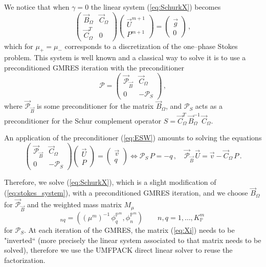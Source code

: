 \documentclass[a4paper,12pt,onecolumn]{article}
\newcommand{\pspace}{\mathbb{P}}
\begin{document}
We notice that when $\gamma = 0$ the linear system (\ref{eq:SchurkX}) becomes
\begin{equation} \label{eq:stokes_system}
\begin{pmatrix}
\vec B_\Omega & \vec C_\Omega \\
\vec C_\Omega^T & 0 
\end{pmatrix}
\begin{pmatrix}
\vec U^{m+1} \\ P^{m+1} 
\end{pmatrix}
= \begin{pmatrix}
\vec g \\
0
\end{pmatrix}\,,
\end{equation}
which for $\mu_+=\mu_-$ corresponds to a discretization of the one--phase Stokes problem. This system is well known and a classical way to solve it is to use a preconditioned GMRES iteration with the preconditioner
\begin{equation} \label{eq:ESW}
\mathcal{P} = \begin{pmatrix}
\vec{\mathcal{P}}_{\vec B} & \vec C_\Omega \\
0 & -\mathcal{P}_S
\end{pmatrix}\,,
\end{equation}
where $\vec{\mathcal{P}}_{\vec B}$ is some preconditioner for the matrix $\vec B_\Omega$, and $\mathcal{P}_S$ acts as a preconditioner for the Schur complement operator $S=\vec C^T_\Omega \,\vec B_\Omega^{-1}\,\vec C_\Omega$. 

An application of the preconditioner (\ref{eq:ESW}) amounts to solving the equations
\begin{equation*} 
\begin{pmatrix}
\vec{\mathcal{P}}_{\vec B} & \vec C_\Omega \\
0 & -\mathcal{P}_S
\end{pmatrix}
\begin{pmatrix} \vec U \\ P \end{pmatrix}
= \begin{pmatrix} \vec v \\ q \end{pmatrix}
\iff
\mathcal{P}_S\,P = -q\,,\quad \vec{\mathcal{P}}_{\vec B}\,\vec U = 
\vec v - \vec C_\Omega\,P\,.
\end{equation*}

Therefore, we solve (\ref{eq:SchurkX}), which is a slight modification of (\ref{eq:stokes_system}), with a preconditioned GMRES iteration, and we choose $\vec B_\Omega$  for $\vec{\mathcal{P}}_{\vec B}$ and the weighted mass matrix $ M_\mu$ 
\begin{equation*} 
[M_\mu]_{nq} = 
\left((\mu^m)^{-1}\,\phi_q^{\pspace^m}, \phi_n^{\pspace^m}\right)
\qquad n,q = 1 ,\ldots, K_\pspace^m\,
\end{equation*}
for $\mathcal{P}_S$.
At each iteration of the GMRES, the matrix (\ref{eq:Xi}) needs to be "inverted`` (more precisely the linear system associated to that matrix needs to be solved), therefore we use the UMFPACK direct linear solver to reuse the factorization.
\end{document}
